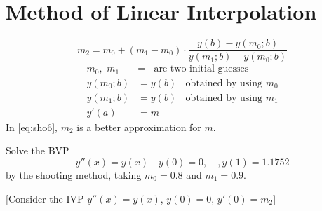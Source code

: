 \documentclass[../main-sheet.tex]{subfiles}
\begin{document}
\section{Method of Linear Interpolation}
\begin{equation}
    m_2=m_0+(m_1-m_0)\cdot\frac{y(b)-y(m_0;b)}{y(m_1;b)-y(m_0;b)}\label{eq:sho6}
\end{equation}
\begin{align*}
    m_0,\,\,m_1&=\;\;\text{ are two initial guesses}\\
    y(m_0;b)&=y(b)\;\;\text{ obtained by using } m_0\\
    y(m_1;b)&=y(b)\;\;\text{ obtained by using } m_1\\
    y'(a)&=m
\end{align*}
In \eqref{eq:sho6}, \(m_2\) is a better approximation for \(m\).
\begin{ex}
    Solve the BVP
    \begin{equation}
        y''(x)=y(x)\quad y(0)=0,\quad, y(1)=1.1752 \label{eq:sho7}
    \end{equation}
    by the shooting method, taking \(m_0=0.8\) and \(m_1=0.9\).

    [Consider the IVP \(y''(x)=y(x)\), \(y(0)=0\), \(y'(0)=m_2\)]
\end{ex}
\end{document}
